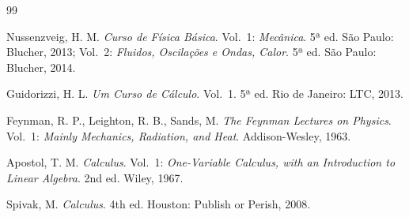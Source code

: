 \documentclass[12pt,a4paper]{article}
\numberwithin{equation}{section}
\numberwithin{table}{section}
\numberwithin{figure}{section}
\begin{document}
\newpage
\begin{thebibliography}{99}

 Nussenzveig, H. M. \textit{Curso de Física Básica}. Vol.~1: \textit{Mecânica}. 5ª ed. São Paulo: Blucher, 2013; Vol.~2: \textit{Fluidos, Oscilações e Ondas, Calor}. 5ª ed. São Paulo: Blucher, 2014.

 Guidorizzi, H. L. \textit{Um Curso de Cálculo}. Vol.~1. 5ª ed. Rio de Janeiro: LTC, 2013.

 Feynman, R. P., Leighton, R. B., Sands, M. \textit{The Feynman Lectures on Physics}. Vol.~1: \textit{Mainly Mechanics, Radiation, and Heat}. Addison-Wesley, 1963.

 Apostol, T. M. \textit{Calculus}. Vol.~1: \textit{One-Variable Calculus, with an Introduction to Linear Algebra}. 2nd ed. Wiley, 1967.

 Spivak, M. \textit{Calculus}. 4th ed. Houston: Publish or Perish, 2008.

\end{thebibliography}
\end{document}
